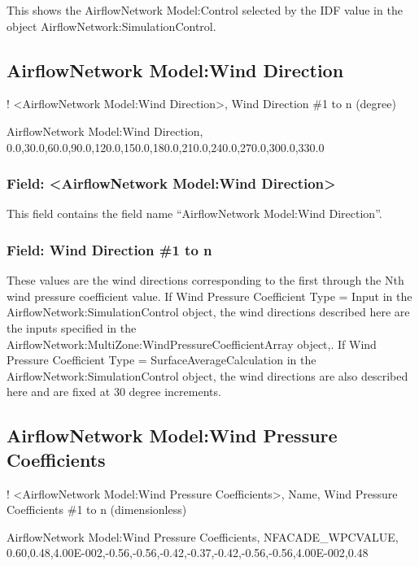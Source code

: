 This shows the AirflowNetwork Model:Control selected by the IDF value in the object AirflowNetwork:SimulationControl.

\subsection{AirflowNetwork Model:Wind Direction}\label{airflownetwork-modelwind-direction}

! \textless{}AirflowNetwork Model:Wind Direction\textgreater{}, Wind Direction \#1 to n (degree)

AirflowNetwork Model:Wind Direction, 0.0,30.0,60.0,90.0,120.0,150.0,180.0,210.0,240.0,270.0,300.0,330.0

\subsubsection{Field: \textless{}AirflowNetwork Model:Wind Direction\textgreater{}}\label{field-airflownetwork-modelwind-direction}

This field contains the field name ``AirflowNetwork Model:Wind Direction''.

\subsubsection{Field: Wind Direction \#1 to n}\label{field-wind-direction-1-to-n}

These values are the wind directions corresponding to the first through the Nth wind pressure coefficient value. If Wind Pressure Coefficient Type = Input in the AirflowNetwork:SimulationControl object, the wind directions described here are the inputs specified in the AirflowNetwork:MultiZone:WindPressureCoefficientArray object,. If Wind Pressure Coefficient Type = SurfaceAverageCalculation in the AirflowNetwork:SimulationControl object, the wind directions are also described here and are fixed at 30 degree increments.

\subsection{AirflowNetwork Model:Wind Pressure Coefficients}\label{airflownetwork-modelwind-pressure-coefficients}

! \textless{}AirflowNetwork Model:Wind Pressure Coefficients\textgreater{}, Name, Wind Pressure Coefficients \#1 to n (dimensionless)

AirflowNetwork Model:Wind Pressure Coefficients, NFACADE\_WPCVALUE, 0.60,0.48,4.00E-002,-0.56,-0.56,-0.42,-0.37,-0.42,-0.56,-0.56,4.00E-002,0.48

